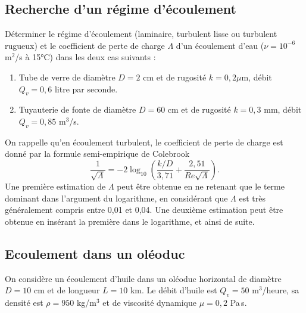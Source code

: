 \subsection{Recherche d'un r\'egime d'\'ecoulement \exonormal}

D\'eterminer le r\'egime d'\'ecoulement (laminaire, turbulent lisse ou turbulent rugueux) 
et le coefficient de perte de charge $\Lambda$ d'un \'ecoulement d'eau 
($\nu = 10^{-6}$ m$^2$/s \`a 15°C) dans les deux cas suivants : 


\begin{enumerate}
\item 
  Tube de verre de diam\`etre $D = 2$ cm et de rugosit\'e $k = 0,2 \mu$m, 
  d\'ebit $Q_v = 0,6$ litre par seconde.
\item 
  Tuyauterie de fonte de diam\`etre $D = 60$ cm et de rugosit\'e $k = 0,3$ mm, 
  d\'ebit $Q_v = 0,85$ m$^3$/s.
\end{enumerate}

On rappelle qu'en \'ecoulement turbulent, le coefficient de perte de charge est donn\'e par 
la formule semi-empirique de Colebrook
$$
  \frac{1}{\sqrt{\Lambda}} = - 2 \log_{10} 
    \left( \frac{k/D}{3,71} + \frac{2,51}{Re \sqrt{\Lambda}} \right).
$$
Une premi\`ere estimation de $\Lambda$ peut \^etre obtenue en ne retenant que le terme dominant 
dans l'argument du logarithme, en consid\'erant que $\Lambda$ est tr\`es g\'en\'eralement compris 
entre 0,01 et 0,04. 
Une deuxi\`eme estimation peut \^etre obtenue en ins\'erant la premi\`ere dans le logarithme, 
et ainsi de suite. 

\subsection{Ecoulement dans un ol\'eoduc \exonormal}

On consid\`ere un \'ecoulement d'huile dans un ol\'eoduc horizontal de diam\`etre $D = 10$ cm 
et de longueur $L = 10$ km. 
Le d\'ebit d'huile est $Q_v = 50$ m$^3$/heure, sa densit\'e est $\rho = 950$ kg/m$^3$ 
et de viscosit\'e dynamique $\mu = 0,2$ Pa\,s.


